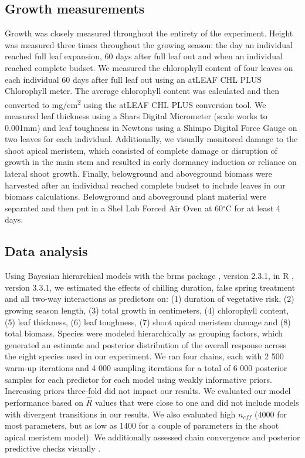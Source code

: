 \documentclass{article}\usepackage[]{graphicx}\usepackage[]{color}
\begin{document}
\subsection*{Growth measurements}
Growth was closely measured throughout the entirety of the experiment. Height was measured three times throughout the growing season: the day an individual reached full leaf expansion, 60 days after full leaf out and when an individual reached complete budset. We measured the chlorophyll content of four leaves on each individual 60 days after full leaf out using an atLEAF CHL PLUS Chlorophyll meter. The average chlorophyll content was calculated and then converted to mg/cm\textsuperscript{2} using the atLEAF CHL PLUS conversion tool. We measured leaf thickness using a Shars Digital Micrometer (scale works to 0.001mm) and leaf toughness in Newtons using a Shimpo Digital Force Gauge on two leaves for each individual. Additionally, we visually monitored damage to the shoot apical meristem, which consisted of complete damage or disruption of growth in the main stem and resulted in early dormancy induction or reliance on lateral shoot growth. Finally, belowground and aboveground biomass were harvested after an individual reached complete budset to include leaves in our biomass calculations. Belowground and aboveground plant material were separated and then put in a Shel Lab Forced Air Oven at 60$^{\circ}$C for at least 4 days. 

\subsection*{Data analysis}
Using Bayesian hierarchical models with the brms package \citep{brms}, version 2.3.1,  in R \citep{R}, version 3.3.1, we estimated the effects of chilling duration, false spring treatment and all two-way interactions as predictors on: (1) duration of vegetative risk, (2) growing season length, (3) total growth in centimeters, (4) chlorophyll content, (5) leaf thickness, (6) leaf toughness, (7) shoot apical meristem damage and (8) total biomass. Species were modeled hierarchically as grouping factors, which generated an estimate and posterior distribution of the overall response across the eight species used in our experiment. We ran four chains, each with 2 500 warm-up iterations and 4 000 sampling iterations for a total of 6 000 posterior samples for each predictor for each model using weakly informative priors. Increasing priors three-fold did not impact our results. We evaluated our model performance based on $\hat{R}$ values that were close to one and did not include models with divergent transitions in our results. We also evaluated high $n_{eff}$ (4000 for most parameters, but as low as 1400 for a couple of parameters in the shoot apical meristem model). We additionally assessed chain convergence and posterior predictive checks visually \citep{BDA}.
\end{document}
